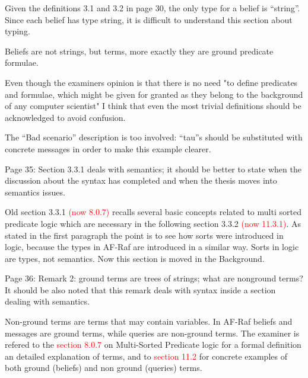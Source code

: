 \documentclass{article}
\newcommand*\R[1]{\textcolor{red}{#1}} %
\newcommand{\todo}[1]{[\textcolor{green}{TODO}: #1]}
\newenvironment{them}{\noindent\begingroup\color{blue}}{\endgroup\par}
\begin{document}
\begin{them}

Given the definitions 3.1 and 3.2 in page 30, the only type for a belief is
“string”. Since each belief has type string, it is difficult to understand this
section about typing.

\end{them}
Beliefs are not strings, but terms, more exactly they are ground predicate
formulae.

Even though the examiners opinion is that there is no need "to define
predicates and formulae, which might be given for granted as they belong to the
background of any computer scientist" I think that even the most trivial
definitions should be acknowledged to avoid confusion. 

\begin{them}

The “Bad scenario” description is too involved: “tau”s should be substituted
with concrete messages in order to make this example clearer.

\end{them}
\todo{}

\begin{them}

Page 35:
Section 3.3.1 deals with semantics; it should be better to state when the
discussion about the syntax has completed and when the thesis moves into
semantics issues.

\end{them}
Old section 3.3.1 \R{(now 8.0.7)} recalls several basic concepts related to
multi sorted predicate logic which are necessary in the following section 3.3.2
\R{(now 11.3.1)}. As stated in the first paragraph the point is to see how
sorts were introduced in logic, because the types in AF-Raf are introduced in a
similar way. Sorts in logic are types, not semantics. Now this section is moved
in the Background.

\begin{them}

Page 36:
Remark 2: ground terms are trees of strings; what are nonground terms? It
should be also noted that this remark deals with syntax inside a section
dealing with semantics.

\end{them}
Non-ground terms are terms that may contain variables. In AF-Raf beliefs and
messages are ground terms, while queries are non-ground terms. The examiner is
refered to the \R{section 8.0.7} on Multi-Sorted Predicate logic for a formal
definition an detailed explanation of terms, and to \R{section 11.2} for
concrete examples of both ground (beliefs) and non ground (queries) terms.
\end{document}
